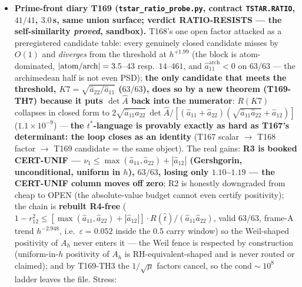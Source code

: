 \documentclass[11pt]{article}
\begin{document}
\begin{itemize}[leftmargin=1.5em]
$6.05\times10^{-3}$ median / $2.82\times10^{-4}$ worst ($h^{-1.146}$) --- by
T168-TH7 that factor \emph{is} the target rewritten (ONE-TERM-MISSING
deliberately not rendered). Scramble breaks harder than T167 ($8/8$ windows
lose $A\succ0$ \emph{and} the Gram property, $n_{\mathrm{neg}}$ up to $73$);
$L_P$ control exact. \textbf{The hardness is self-similar under exact
reformulation} --- determinant $\to$ PSD compound at a closed vector $\to$
near-null Rayleigh value $\to$ one ratio of two closed lag sums, same
accuracy price. Balance $8$ THEOREM / $0$ CERT-UNIF / $3$ CERT-WINDOW /
$11$ MEASURED / $7$ NO-GO.
\item \textbf{Prime-front diary T169 (\texttt{tstar\_ratio\_probe.py}, contract
\texttt{TSTAR.RATIO}, $41/41$, $3.0$\,s, same union surface; verdict
RATIO-RESISTS --- the self-similarity \emph{proved}, sandbox).} T168's one
open factor attacked as a preregistered candidate table: every genuinely
closed candidate misses by $O(1)$ and \emph{diverges} from the threshold at
$h^{+1.99}$ (the block is atom-dominated, $|{\rm atom/arch}|=3.5$--$43$ resp.\
$14$--$461$, and $\hat a_{11}^{\mathrm{arch}}<0$ on $63/63$ --- the
archimedean half is not even PSD); \textbf{the only candidate that meets the
threshold, $K7=\sqrt{\hat a_{22}/\hat a_{11}}$ ($63/63$), does so by a new
theorem (T169-TH7) because it puts $\det\hat A$ back into the numerator}:
$R(K7)$ collapses in closed form to $2\sqrt{\hat a_{11}\hat a_{22}}\,\det\hat
A/[(\hat a_{11}+\hat a_{22})(\sqrt{\hat a_{11}\hat a_{22}}+\hat a_{12})]$
($1.1\times10^{-9}$) --- \textbf{the $t^*$-language is provably exactly as
hard as T167's determinant: the loop closes as an identity} (T167 scalar
$\to$ T168 factor $\to$ T169 candidate = the same object). The real gains:
\textbf{R3 is booked CERT-UNIF --- $\nu_1\le\max(\hat a_{11},\hat
a_{22})+|\hat a_{12}|$ (Gershgorin, unconditional, uniform in $h$), $63/63$,
losing only $1.10$--$1.19$ --- the CERT-UNIF column moves off zero}; R2 is
honestly downgraded from cheap to OPEN (the absolute-value budget cannot even
certify positivity); the chain is \textbf{rebuilt R4-free} ($1-r_{12}^2\le
[\max(\hat a_{11},\hat a_{22})+|\hat a_{12}|]\cdot R(\hat t)/(\hat
a_{11}\hat a_{22})$, valid $63/63$, frame-A trend $h^{-2.948}$, i.e.\
$\varepsilon=0.052$ inside the $0.5$ carry window) so the Weil-shaped
positivity of $A_h$ never enters it --- the Weil fence is respected by
construction (uniform-in-$h$ positivity of $A_h$ is RH-equivalent-shaped and
is never routed or claimed); and by T169-TH3 the $1/\sqrt{\mu}$ factors
cancel, so the $\mathrm{cond}\sim10^{8}$ ladder leaves the file. Stress:

\end{itemize}
\end{document}
